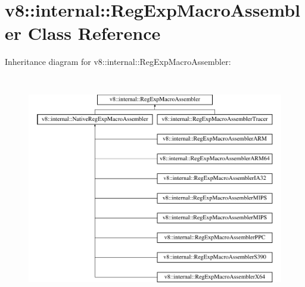 \hypertarget{classv8_1_1internal_1_1RegExpMacroAssembler}{}\section{v8\+:\+:internal\+:\+:Reg\+Exp\+Macro\+Assembler Class Reference}
\label{classv8_1_1internal_1_1RegExpMacroAssembler}
Inheritance diagram for v8\+:\+:internal\+:\+:Reg\+Exp\+Macro\+Assembler\+:\begin{figure}[H]
\begin{center}
\leavevmode
\includegraphics[height=10.000000cm]{classv8_1_1internal_1_1RegExpMacroAssembler}
\end{center}
\end{figure}
